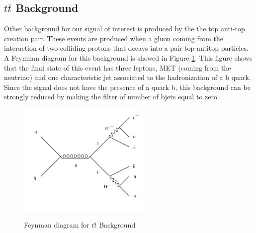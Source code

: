  \subsection{$t \overline{t}$ Background}
 
 Other background for our signal of interest is produced by the the top anti-top creation pair. These events are produced when a gluon coming from the interaction of two colliding protons that decays into
 a pair top-antitop particles. A Feynman diagram for this background is showed in Figure \ref{t_tbar_feynman}. This figure shows that the final state of this event has three leptons, MET (coming
 from the neutrino) and one characteristic jet associated to the hadronization of a b quark. Since the signal does not have the presence of a quark b, this background can be strongly reduced by 
 making the filter of number of bjets equal to zero.
 
 
  \begin{figure}[h] 
 \centering
 \caption{Feynman diagram for $t \overline{t}$ Background}
 \includegraphics[width=0.6\textwidth]{./Capitulos/Model/ttbar}  
 \label{t_tbar_feynman}
 \end{figure} 
 
 
 
 
 
